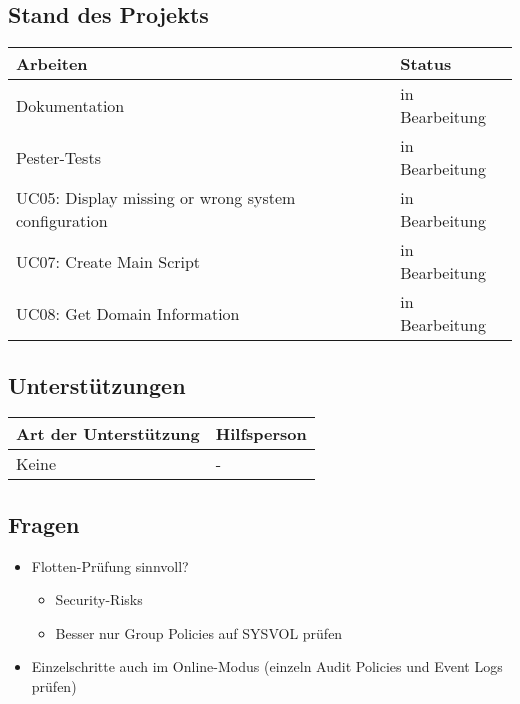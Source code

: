 \subsection*{Stand des Projekts}
\begin{table}[H]
    \centering
    \begin{tabular}{p{12cm} p{4cm}}
        \textbf{Arbeiten} & \textbf{Status} \\ \hline
        Dokumentation & in Bearbeitung \\ \hline
        Pester-Tests & in Bearbeitung \\ \hline
        UC05: Display missing or wrong system configuration & in Bearbeitung \\ \hline
        UC07: Create Main Script & in Bearbeitung \\ \hline
        UC08: Get Domain Information & in Bearbeitung \\ \hline
    \end{tabular}
\end{table}

\vspace{1cm}

\subsection*{Unterstützungen}
\begin{table}[H]
    \centering
    \begin{tabular}{p{12cm} p{4cm}}
        \textbf{Art der Unterstützung} & \textbf{Hilfsperson} \\ \hline
        Keine & - \\ \hline
    \end{tabular}
\end{table}

\vspace{1cm}

\subsection*{Fragen}
\begin{itemize}
    \item Flotten-Prüfung sinnvoll?
    \begin{itemize}
        \item Security-Risks
        \item Besser nur Group Policies auf SYSVOL prüfen
    \end{itemize}
    \item Einzelschritte auch im Online-Modus (einzeln Audit Policies und Event Logs prüfen)
\end{itemize}

